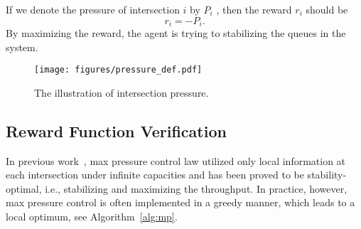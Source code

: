 \begin{itemize}
    If we denote the pressure of intersection $i$ by $P_i$ , then the reward $r_i$ should be
        \begin{equation}
            \label{eq:reward-detail}
            r_i  = - P_i.
        \end{equation}
    By maximizing the reward, the agent is trying to stabilizing the queues in the system.
    \begin{figure}[htbp]
        \centering
        \texttt{[image: figures/pressure\_def.pdf]} %
        \caption{The illustration of intersection pressure.}%
        \label{fig:pressure}
        \end{figure}
\end{itemize}


\subsection{Reward Function Verification}
In previous work~\cite{varaiya2013max}, max pressure control law utilized only local information at each intersection under infinite capacities and has been proved to be stability-optimal, i.e., stabilizing and maximizing the throughput. In practice, however, max pressure control is often implemented in a greedy manner, which leads to a local optimum, see Algorithm~\ref{alg:mp}.



